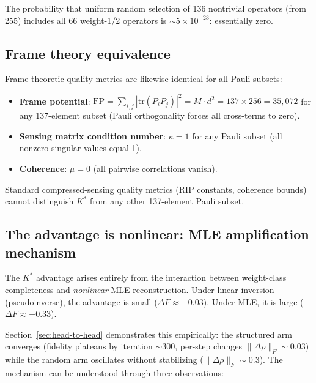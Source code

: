 \documentclass[twocolumn,prx,aps,superscriptaddress,longbibliography,floatfix]{revtex4-2}
\begin{document}
The probability that uniform random selection of 136 nontrivial
operators (from 255) includes all 66 weight-1/2 operators is
$\sim 5 \times 10^{-23}$: essentially zero.

\subsection{Frame theory equivalence}
\label{sec:frame}

Frame-theoretic quality metrics are likewise identical for all
Pauli subsets:
\begin{itemize}
\item \textbf{Frame potential}: $\mathrm{FP} = \sum_{i,j}
|\mathrm{tr}(P_i P_j)|^2 = M \cdot d^2 = 137 \times 256 =
35{,}072$ for any 137-element subset (Pauli orthogonality forces
all cross-terms to zero).
\item \textbf{Sensing matrix condition number}: $\kappa = 1$ for
any Pauli subset (all nonzero singular values equal 1).
\item \textbf{Coherence}: $\mu = 0$ (all pairwise correlations
vanish).
\end{itemize}

Standard compressed-sensing quality metrics (RIP constants,
coherence bounds) cannot distinguish $K^*$ from any other
137-element Pauli subset.

\subsection{The advantage is nonlinear: MLE amplification mechanism}
\label{sec:mle-mechanism}

The $K^*$ advantage arises entirely from the interaction between
weight-class completeness and \emph{nonlinear} MLE reconstruction.
Under linear inversion (pseudoinverse), the advantage is small
($\Delta F \approx +0.03$).  Under MLE, it is large
($\Delta F \approx +0.33$).

Section~\ref{sec:head-to-head} demonstrates this empirically: the structured arm
converges (fidelity plateaus by iteration $\sim$300, per-step
changes $\|\Delta\rho\|_F \sim 0.03$) while the random arm
oscillates without stabilizing ($\|\Delta\rho\|_F \sim 0.3$).
The mechanism can be understood through three observations:
\end{document}
